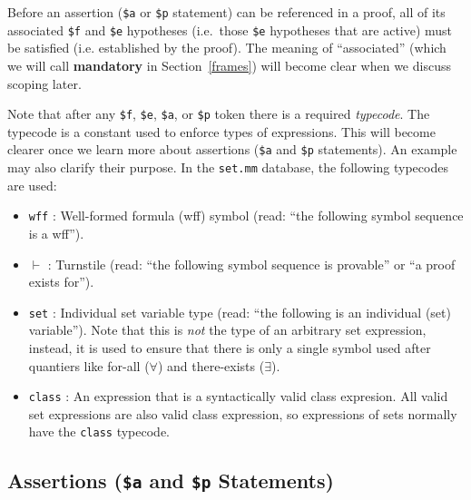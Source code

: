 Before an assertion (\texttt{\$a} or \texttt{\$p} statement) can be
referenced in a proof, all of its associated \texttt{\$f} and \texttt{\$e} hypotheses
(i.e.\ those \texttt{\$e} hypotheses that are active) must be satisfied (i.e.
established by the proof).  The meaning of ``associated'' (which we will call
{\bf mandatory} in Section~\ref{frames}) will become clear when we discuss
scoping later.

Note that after any \texttt{\$f}, \texttt{\$e},
\texttt{\$a}, or \texttt{\$p} token there is a required
\textit{typecode}.
The typecode is a constant used to enforce types of expressions.
This will become clearer once we learn more about
assertions (\texttt{\$a} and \texttt{\$p} statements).
An example may also clarify their purpose.
In the
\texttt{set.mm}%
database,
the following typecodes are used:

\begin{itemize}
\item \texttt{wff} :
  Well-formed formula (wff) symbol
  (read: ``the following symbol sequence is a wff'').
\item \texttt{$\vdash$} :
  Turnstile (read: ``the following symbol sequence is provable'' or
  ``a proof exists for'').
\item \texttt{set} :
  Individual set variable type (read: ``the following is an
  individual (set) variable'').
  Note that this is \textit{not} the type of an arbitrary set expression,
  instead, it is used to ensure that there is only a single symbol used
  after quantiers like for-all ($\forall$) and there-exists ($\exists$).
\item \texttt{class} :
  An expression that is a syntactically valid class expresion.
  All valid set expressions are also valid class expression, so expressions
  of sets normally have the \texttt{class} typecode.
\end{itemize}

\subsection{Assertions (\texttt{\$a} and \texttt{\$p} Statements)}

